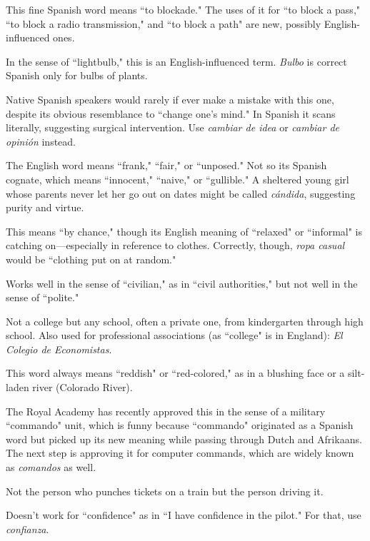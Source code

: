  This fine Spanish word means ``to blockade."
The uses of it for ``to block a pass," ``to block a radio transmission,"
and ``to block a path" are new, possibly English-influenced ones.

 In the sense of ``lightbulb," this is an English-influenced term. \emph{Bulbo} is correct Spanish only for bulbs of plants.

 Native Spanish speakers would rarely if
ever make a mistake with this one, despite its obvious resemblance to
``change one's mind." In Spanish it scans literally, suggesting surgical
intervention. Use \emph{cambiar de idea} or \emph{cambiar de opinión} instead.

 The English word means ``frank," ``fair," or ``unposed." Not so its Spanish cognate, which means ``innocent," ``naive,"
or ``gullible." A sheltered young girl whose parents never let her go out
on dates might be called \emph{cándida}, suggesting purity and virtue.

 This means ``by chance," though its English meaning of ``relaxed" or ``informal" is catching on---especially in reference
to clothes. Correctly, though, \emph{ropa casual} would be ``clothing put on at
random."

 Works well in the sense of ``civilian," as in ``civil authorities," but not well in the sense of ``polite."

 Not a college but any school, often a private one,
from kindergarten through high school. Also used for professional associations (as ``college" is in England): \emph{El Colegio de Economistas}.

 This word always means ``reddish" or ``red-colored," as in a blushing face or a silt-laden river (Colorado River).

 The Royal Academy has recently approved this in
the sense of a military ``commando" unit, which is funny because ``commando" originated as a Spanish word but picked up its new meaning
while passing through Dutch and Afrikaans. The next step is approving it for computer commands, which are widely known as \emph{comandos}
as well.

 Not the person who punches tickets on a train
but the person driving it.

 Doesn't work for ``confidence" as in ``I have
confidence in the pilot." For that, use \emph{confianza}.

